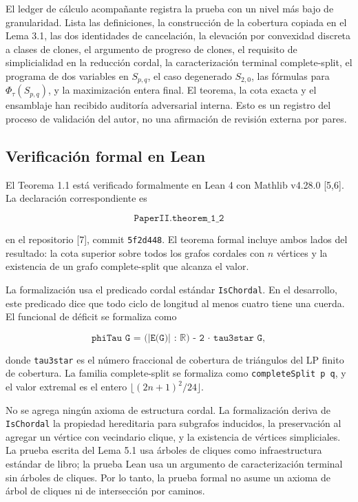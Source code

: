 \documentclass[
  11pt,
]{article}
\begin{document}
El ledger de cálculo acompañante registra la prueba con un nivel más
bajo de granularidad. Lista las definiciones, la construcción de la
cobertura copiada en el Lema 3.1, las dos identidades de cancelación, la
elevación por convexidad discreta a clases de clones, el argumento de
progreso de clones, el requisito de simplicialidad en la reducción
cordal, la caracterización terminal complete-split, el programa de dos
variables en \(S_{p,q}\), el caso degenerado \(S_{2,0}\), las fórmulas
para \(\Phi_\tau(S_{p,q})\), y la maximización entera final. El teorema,
la cota exacta y el ensamblaje han recibido auditoría adversarial
interna. Esto es un registro del proceso de validación del autor, no una
afirmación de revisión externa por pares.

\subsection{Verificación formal en
Lean}\label{verificaciuxf3n-formal-en-lean}

El Teorema 1.1 está verificado formalmente en Lean 4 con Mathlib v4.28.0
{[}5,6{]}. La declaración correspondiente es

\[
\texttt{PaperII.theorem\_1\_2}
\]

en el repositorio {[}7{]}, commit \texttt{5f2d448}. El teorema formal
incluye ambos lados del resultado: la cota superior sobre todos los
grafos cordales con \(n\) vértices y la existencia de un grafo
complete-split que alcanza el valor.

La formalización usa el predicado cordal estándar \texttt{IsChordal}. En
el desarrollo, este predicado dice que todo ciclo de longitud al menos
cuatro tiene una cuerda. El funcional de déficit se formaliza como

\[
\texttt{phiTau G = (|E(G)| : ℝ) - 2 · tau3star G},
\]

donde \texttt{tau3star} es el número fraccional de cobertura de
triángulos del LP finito de cobertura. La familia complete-split se
formaliza como \texttt{completeSplit\ p\ q}, y el valor extremal es el
entero \(\lfloor(2n+1)^2/24\rfloor\).

No se agrega ningún axioma de estructura cordal. La formalización deriva
de \texttt{IsChordal} la propiedad hereditaria para subgrafos inducidos,
la preservación al agregar un vértice con vecindario clique, y la
existencia de vértices simpliciales. La prueba escrita del Lema 5.1 usa
árboles de cliques como infraestructura estándar de libro; la prueba
Lean usa un argumento de caracterización terminal sin árboles de
cliques. Por lo tanto, la prueba formal no asume un axioma de árbol de
cliques ni de intersección por caminos.
\end{document}
